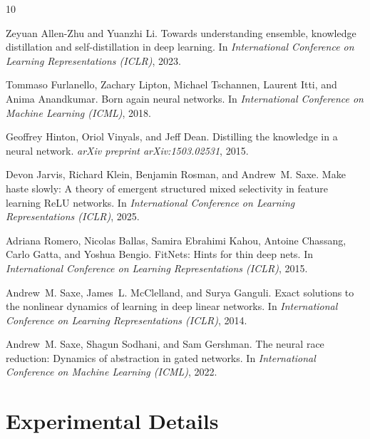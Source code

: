 \documentclass{article}
\begin{document}
\begin{thebibliography}{10}

Zeyuan Allen-Zhu and Yuanzhi Li.
\newblock Towards understanding ensemble, knowledge distillation and self-distillation in deep learning.
\newblock In \emph{International Conference on Learning Representations (ICLR)}, 2023.

Tommaso Furlanello, Zachary Lipton, Michael Tschannen, Laurent Itti, and Anima Anandkumar.
\newblock Born again neural networks.
\newblock In \emph{International Conference on Machine Learning (ICML)}, 2018.

Geoffrey Hinton, Oriol Vinyals, and Jeff Dean.
\newblock Distilling the knowledge in a neural network.
\newblock \emph{arXiv preprint arXiv:1503.02531}, 2015.

Devon Jarvis, Richard Klein, Benjamin Rosman, and Andrew~M. Saxe.
\newblock Make haste slowly: A theory of emergent structured mixed selectivity in feature learning ReLU networks.
\newblock In \emph{International Conference on Learning Representations (ICLR)}, 2025.

Adriana Romero, Nicolas Ballas, Samira Ebrahimi Kahou, Antoine Chassang, Carlo Gatta, and Yoshua Bengio.
\newblock FitNets: Hints for thin deep nets.
\newblock In \emph{International Conference on Learning Representations (ICLR)}, 2015.

Andrew~M. Saxe, James~L. McClelland, and Surya Ganguli.
\newblock Exact solutions to the nonlinear dynamics of learning in deep linear networks.
\newblock In \emph{International Conference on Learning Representations (ICLR)}, 2014.

Andrew~M. Saxe, Shagun Sodhani, and Sam Gershman.
\newblock The neural race reduction: Dynamics of abstraction in gated networks.
\newblock In \emph{International Conference on Machine Learning (ICML)}, 2022.

\end{thebibliography}

\appendix

\section{Experimental Details}
\label{app:details}
\end{document}
